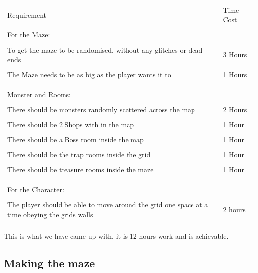 \documentclass[12pt]{article}
\begin{document}
\begin{tabularx}{\linewidth}{XX}
Requirement                                                                                    					         & Time Cost \\ \\
For the Maze: 																		  & 			  \\ \\
To get the maze to be randomised, without any glitches or dead ends                          		  & 3 Hours     \\ \\
The Maze needs to be as big as the player wants it to                                         			  & 1 Hours     \\ \\
																				  	  &			  \\ \\
Monster and Rooms:																  	  &			  \\ \\
There should be monsters randomly scattered across the map                                    	        & 2 Hours     \\ \\
There should be 2 Shops with in the map												  & 1 Hour   	  \\ \\
There should be a Boss room inside the map												  & 1 Hour	  \\ \\
There should be the trap rooms inside the grid											  & 1 Hour 	  \\ \\
There should be treasure rooms inside the maze											  & 1 Hour 	  \\ \\
																					  & 			  \\ \\
For the Character:																	  & 			  \\ \\
The player should be able to move around the grid one space at a time obeying the grids walls  & 2 hours  	  \\ \\
\end{tabularx}

This is what we have came up with, it is 12 hours work and is achievable.

\subsection{Making the maze}
\end{document}
